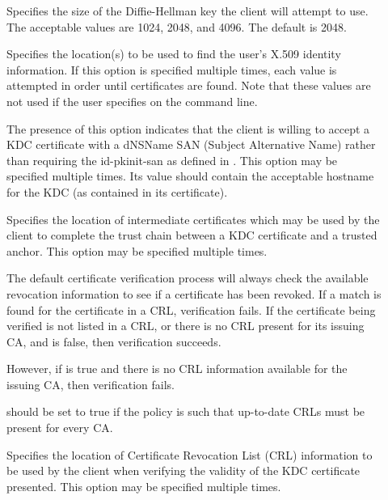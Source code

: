 \documentclass[letterpaper,10pt,english]{sphinxmanual}
\begin{document}
\begin{description}
\item[{}] \leavevmode
Specifies the size of the Diffie-Hellman key the client will
attempt to use.  The acceptable values are 1024, 2048, and 4096.
The default is 2048.

\item[{}] \leavevmode
Specifies the location(s) to be used to find the user’s X.509
identity information.  If this option is specified multiple times,
each value is attempted in order until certificates are found.
Note that these values are not used if the user specifies
 on the command line.

\item[{}] \leavevmode
The presence of this option indicates that the client is willing
to accept a KDC certificate with a dNSName SAN (Subject
Alternative Name) rather than requiring the id-pkinit-san as
defined in .  This option may be specified multiple
times.  Its value should contain the acceptable hostname for the
KDC (as contained in its certificate).

\item[{}] \leavevmode
Specifies the location of intermediate certificates which may be
used by the client to complete the trust chain between a KDC
certificate and a trusted anchor.  This option may be specified
multiple times.

\item[{}] \leavevmode
The default certificate verification process will always check the
available revocation information to see if a certificate has been
revoked.  If a match is found for the certificate in a CRL,
verification fails.  If the certificate being verified is not
listed in a CRL, or there is no CRL present for its issuing CA,
and  is false, then verification
succeeds.

However, if  is true and there is
no CRL information available for the issuing CA, then verification
fails.

 should be set to true if the
policy is such that up-to-date CRLs must be present for every CA.

\item[{}] \leavevmode
Specifies the location of Certificate Revocation List (CRL)
information to be used by the client when verifying the validity
of the KDC certificate presented.  This option may be specified
multiple times.

\end{description}
\end{document}
